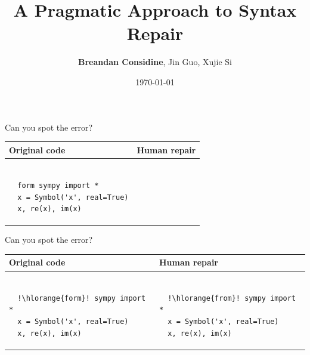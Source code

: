 \documentclass{beamer}
\title[A Pragmatic Approach to Syntax Repair]{A Pragmatic Approach to Syntax Repair}
\author[Considine, Guo, Si]{\textbf{Breandan Considine}, Jin Guo, Xujie Si}
\institute[McGill]{
  McGill University, Mila IQIA\\
  \medskip
  \textit{bre@ndan.co}
}
\date{\today}
\begin{document}
\begin{frame}
  \titlepage
\end{frame}


\begin{frame}[fragile]{Can you spot the error?}
  \begin{center}
    \begin{tabular}{|m{5.5cm}|m{5.5cm}|}
      \hline \rule{0pt}{2.5ex}\textbf{Original code}\rule[-1ex]{0pt}{2ex} &  \rule{0pt}{2.5ex}\textbf{Human repair}\rule[-1ex]{0pt}{2ex} \\\hline
      \begin{lstlisting}[escapechar=!, basicstyle=\linespread{1.3}\ttfamily\footnotesize]

  form sympy import *
  x = Symbol('x', real=True)
  x, re(x), im(x)

      \end{lstlisting} & \begin{lstlisting}[escapechar=!, basicstyle=\linespread{1.3}\ttfamily\footnotesize]

      \end{lstlisting} \\\hline
    \end{tabular}
  \end{center}
\end{frame}

\begin{frame}[fragile]{Can you spot the error?}
  \begin{center}
    \begin{tabular}{|m{5.5cm}|m{5.5cm}|}
      \hline \rule{0pt}{2.5ex}\textbf{Original code}\rule[-1ex]{0pt}{2ex} &  \rule{0pt}{2.5ex}\textbf{Human repair}\rule[-1ex]{0pt}{2ex} \\\hline
      \begin{lstlisting}[escapechar=!, basicstyle=\linespread{1.3}\ttfamily\footnotesize]

  !\hlorange{form}! sympy import *
  x = Symbol('x', real=True)
  x, re(x), im(x)

      \end{lstlisting} & \begin{lstlisting}[escapechar=!, basicstyle=\linespread{1.3}\ttfamily\footnotesize]

  !\hlorange{from}! sympy import *
  x = Symbol('x', real=True)
  x, re(x), im(x)

      \end{lstlisting} \\\hline
    \end{tabular}
  \end{center}
\end{frame}
\end{document}
